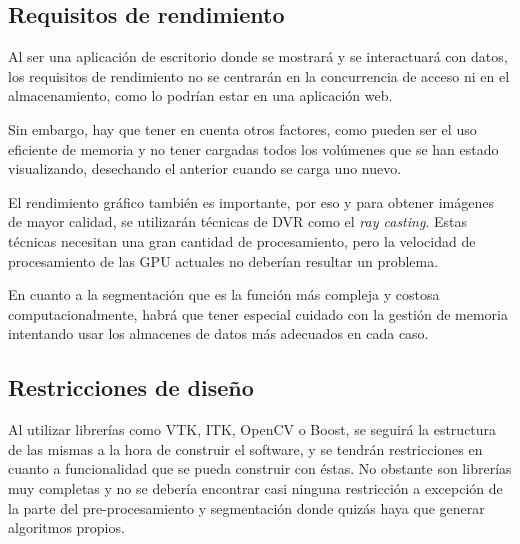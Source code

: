 \subsection{Requisitos de rendimiento}

Al ser una aplicación de escritorio donde se mostrará y se interactuará con datos, los requisitos de rendimiento no se centrarán en la concurrencia de acceso ni en el almacenamiento, como lo podrían estar en una aplicación web.

Sin embargo, hay que tener en cuenta otros factores, como pueden ser el uso eficiente de memoria y no tener cargadas todos los volúmenes que se han estado visualizando, desechando el anterior cuando se carga uno nuevo.

El rendimiento gráfico también es importante, por eso y para obtener imágenes de mayor calidad, se utilizarán técnicas de DVR como el \textit{ray casting}. Estas técnicas necesitan una gran cantidad de procesamiento, pero la velocidad de procesamiento de las GPU actuales no deberían resultar un problema.

En cuanto a la segmentación que es la función más compleja y costosa computacionalmente, habrá que tener especial cuidado con la gestión de memoria intentando usar los almacenes de datos más adecuados en cada caso.

\subsection{Restricciones de diseño}

Al utilizar librerías como VTK, ITK, OpenCV o Boost, se seguirá la estructura de las mismas a la hora de construir el software, y se tendrán restricciones en cuanto a funcionalidad que se pueda construir con éstas. No obstante son librerías muy completas y no se debería encontrar casi ninguna restricción a excepción de la parte del pre-procesamiento y segmentación donde quizás haya que generar algoritmos propios.

